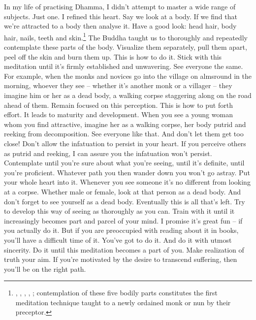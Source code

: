 In my life of practising Dhamma, I didn't attempt to master a wide range of subjects. Just one. I refined this heart. Say we look at a body. If we find that we're attracted to a body then analyse it. Have a good look: head hair, body hair, nails, teeth and skin.\footnote{, , , , ; contemplation of these five bodily parts constitutes the first meditation technique taught to a newly ordained monk or nun by their preceptor.} The Buddha taught us to thoroughly and repeatedly contemplate these parts of the body. Visualize them separately, pull them apart, peel off the skin and burn them up. This is how to do it. Stick with this meditation until it's firmly established and unwavering. See everyone the same. For example, when the monks and novices go into the village on almsround in the morning, whoever they see -- whether it's another monk or a villager -- they imagine him or her as a dead body, a walking corpse staggering along on the road ahead of them. Remain focused on this perception. This is how to put forth effort. It leads to maturity and development. When you see a young woman whom you find attractive, imagine her as a walking corpse, her body putrid and reeking from decomposition. See everyone like that. And don't let them get too close! Don't allow the infatuation to persist in your heart. If you perceive others as putrid and reeking, I can assure you the infatuation won't persist. Contemplate until you're sure about what you're seeing, until it's definite, until you're proficient. Whatever path you then wander down you won't go astray. Put your whole heart into it. Whenever you see someone it's no different from looking at a corpse. Whether male or female, look at that person as a dead body. And don't forget to see yourself as a dead body. Eventually this is all that's left. Try to develop this way of seeing as thoroughly as you can. Train with it until it increasingly becomes part and parcel of your mind. I promise it's great fun -- if you actually do it. But if you are preoccupied with reading about it in books, you'll have a difficult time of it. You've got to do it. And do it with utmost sincerity. Do it until this meditation becomes a part of you. Make realization of truth your aim. If you're motivated by the desire to transcend suffering, then you'll be on the right path.

